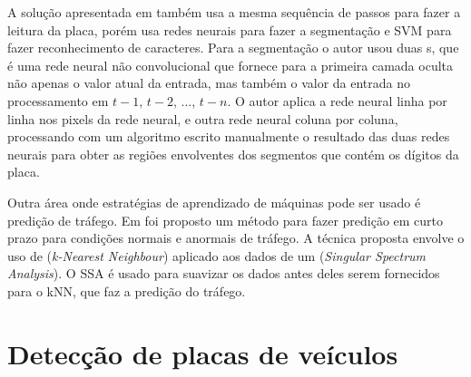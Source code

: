 A solução apresentada em
\cite{kim2000learning} também usa a mesma sequência de
passos para fazer a leitura da placa, porém usa redes neurais para 
fazer a segmentação e SVM para fazer reconhecimento de caracteres. Para a
segmentação o autor usou duas
s, que é uma rede neural não convolucional que
fornece para a primeira camada oculta não apenas o valor atual da entrada, mas
também o valor da entrada no processamento em $t-1$, $t-2$, ..., $t-n$. O autor
aplica a rede neural linha por linha nos pixels da rede neural, e outra rede
neural coluna por coluna, processando com um algoritmo escrito manualmente o
resultado das duas redes neurais para obter as regiões envolventes dos
segmentos que contém os dígitos da placa.

Outra área onde estratégias de aprendizado de máquinas pode ser usado é
predição de tráfego. Em \cite{guo2012short} foi proposto um método para fazer
predição em curto prazo para condições normais e anormais de tráfego. A técnica
proposta envolve o uso de  (\emph{k-Nearest Neighbour}) aplicado aos dados de um
(\emph{Singular Spectrum Analysis}). O SSA é usado para suavizar os dados antes
deles serem fornecidos para o kNN, que faz a predição do tráfego.

\section{Detecção de placas de veículos}


